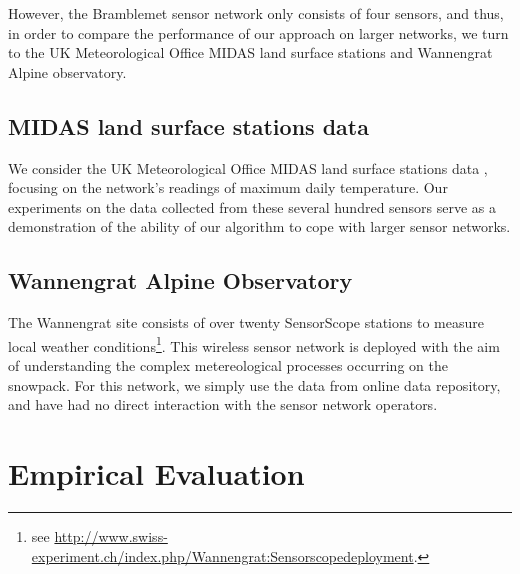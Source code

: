 \documentclass{acmtrans2m}
\begin{document}
However, the Bramblemet sensor network only consists of four sensors, and thus, in order to compare the performance of our approach on larger networks, we turn to the UK Meteorological Office MIDAS land
surface stations and Wannengrat Alpine observatory.

\subsection{MIDAS land surface stations data}

We consider the UK Meteorological Office MIDAS land
surface stations data \cite{MIDASdata}, focusing on the network's readings of maximum daily temperature. Our experiments on the data collected from these several hundred sensors serve as a demonstration of the ability of our algorithm to cope with larger sensor networks. 
 
\subsection{Wannengrat Alpine Observatory}

The Wannengrat site consists of over twenty SensorScope stations to measure local weather conditions\footnote{see \url{http://www.swiss-experiment.ch/index.php/Wannengrat:Sensorscopedeployment}.}.
This wireless sensor network is deployed with the aim of
understanding the complex metereological processes occurring on the
snowpack. For this network, we simply use the data from online data repository, and have had no direct interaction with the sensor network operators.

\section{Empirical Evaluation}\label{sec_evaluation}
\end{document}
